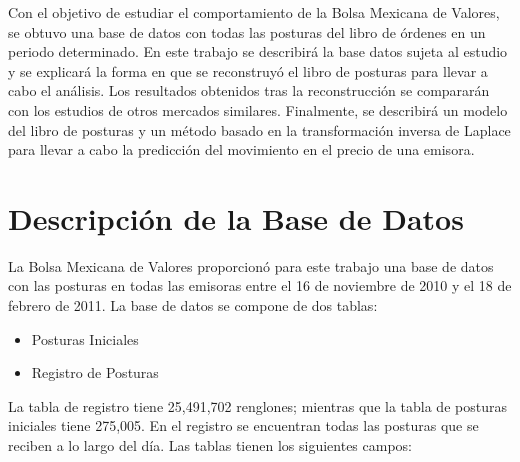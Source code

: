\documentclass[11pt]{article}
\numberwithin{equation}{section} %
\begin{document}
Con el objetivo de estudiar el comportamiento de la Bolsa Mexicana de Valores, se obtuvo una base de datos con todas las posturas del libro de órdenes en un periodo determinado. En este trabajo se describirá la base datos sujeta al estudio y se explicará la forma en que se reconstruyó el libro de posturas para llevar a cabo el análisis. Los resultados obtenidos tras la reconstrucción se compararán con los estudios de otros mercados similares. Finalmente, se describirá un modelo del libro de posturas y un método basado en la transformación inversa de Laplace para llevar a cabo la predicción del movimiento en el precio de una emisora.

\clearpage

\section{Descripción de la Base de Datos}
La Bolsa Mexicana de Valores proporcionó para este trabajo una base de datos con las posturas en todas las emisoras entre el 16 de noviembre de 2010 y el 18 de febrero de 2011. La base de datos se compone de dos tablas:

\begin{itemize}
  \item Posturas Iniciales
  \item Registro de Posturas
\end{itemize}

La tabla de registro tiene 25,491,702 renglones; mientras que la tabla de posturas iniciales tiene 275,005. En el registro se encuentran todas las posturas que se reciben a lo largo del día. Las tablas tienen los siguientes campos:\\
\end{document}
